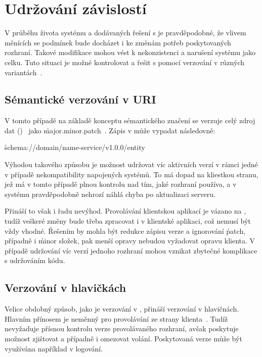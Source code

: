 \section{Udržování závislostí}\label{sec:msa-dependencies}

V průběhu života systému a dodávaných řešení s  je pravděpodobné, že vlivem měnících se podmínek bude docházet i ke změnám potřeb poskytovaných rozhraní.
Takové modifikace mohou vést k nekonzistenci a narušení systému jako celku.
Tuto situaci je možné kontrolovat a řešit s pomocí verzování v různých variantách~\cite{msversions}.



\subsection{Sémantické verzování v URI}\label{subsec:msa-dependencies-uri}

V tomto případě na základě konceptu sémantického značení se verzuje celý zdroj dat ()~\cite{msversions} jako \h{major.minor.patch}~\cite{semver}.
Zápis v může vypadat následovně:

\h{schema://domain/name-service/v1.0.0/entity}

Výhodou takového způsobu je možnost udržovat víc aktivních  verzí v rámci jedné  v případě nekompatibility napojených systémů.
To má dopad na kliestkou stranu, jež má v tomto případě plnou kontrolu nad tím, jaké rozhraní používa, a v systému pravděpodobně nehrozí náhlá chyba po aktualizaci serveru.

Přináší to však i řadu nevýhod.
Provolávání  klientskou aplikací je vázano na , tudíž veškeré změny bude třeba zpracovat i v klientské aplikaci, což nemusí být vždy vhodné.
Řešením by mohla být redukce zápisu verze a ignorování \h{patch}, případně i \h{minor} složek, pak menší opravy nebudou vyžadovat opravu klienta.
V případě udržování víc verzí jednoho rozhraní mohou vznikat zbytečné komplikace s udržováním kódu.



\subsection{Verzování v hlavičkách }\label{subsec:msa-dependencies-headers}

Velice obdobný způsob, jako je verzování v , přináší verzování v  hlavičnách.
Hlavním přínosem je neměnný  pro provolávání ze strany klienta~\cite{msversions}.
Tudíž nevyžaduje přísnou kontrolu verze provolávaného rozhraní, avšak poskytuje možnost zjištovat a případně i omezovat volání.
Poskytovaná verze může být využívána například v logování.



